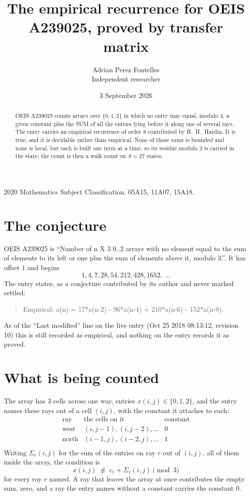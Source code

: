 \documentclass[11pt,a4paper]{article}
\title{The empirical recurrence for OEIS A239025, proved by transfer matrix}
\author{Adrian Perez Fontelles\\ \small Independent researcher}
\date{3 September 2026}
\theoremstyle{plain}
\theoremstyle{definition}
\begin{document}
\maketitle

\begin{abstract}
OEIS A239025 counts arrays over $\{0,1,2\}$ in which no entry may equal, modulo $3$, a given
constant plus the SUM of all the entries lying before it along one of several rays. The entry
carries an empirical recurrence of order $8$ contributed by R.~H.~Hardin. It is true, and
it is decidable rather than empirical. None of those sums is bounded and none is local, but
each is built one term at a time, so its residue modulo $3$ is carried in the state; the
count is then a walk count on $S=27$ states.
\end{abstract}

\noindent\small 2020 Mathematics Subject Classification. 05A15, 11A07, 15A18.\normalsize

\section{The conjecture}

OEIS A239025 is ``Number of n X 3 0..2 arrays with no element equal to the sum of elements to its left or one plus the sum of elements above it, modulo 3.''. It has offset $1$ and begins
\[
1, 4, 7, 28, 54, 212, 428, 1652,\ \dots
\]
The entry states, as a conjecture contributed by its author and never marked settled:
\begin{quote}
Empirical: a(n) = 17*a(n-2) - 96*a(n-4) + 210*a(n-6) - 152*a(n-8).
\end{quote}
As of the ``Last modified'' line on the live entry (Oct 25 2018 08:13:12, revision 10) this is still
recorded as empirical, and nothing on the entry records it as proved.

\section{What is being counted}

The array has $3$ cells across one way, entries $x(i,j)\in\{0,1,2\}$, and the entry names these
rays out of a cell $(i,j)$, with the constant it attaches to each:
\[
\begin{array}{lll}
\text{ray} & \text{the cells on it} & \text{constant} \\[2pt]
\text{west} & (i,j-1),(i,j-2),\dots & 0 \\
\text{north} & (i-1,j),(i-2,j),\dots & 1 \\
\end{array}
\]
Writing $\Sigma_r(i,j)$ for the sum of the entries on ray $r$ out of $(i,j)$, all of them
inside the array, the condition is
\[
x(i,j)\;\not\equiv\;c_r+\Sigma_r(i,j) \pmod{3}
\]
for every ray $r$ named. A ray that leaves the array at once contributes the empty sum,
zero, and a ray the entry names without a constant carries the constant $0$.
\end{document}
